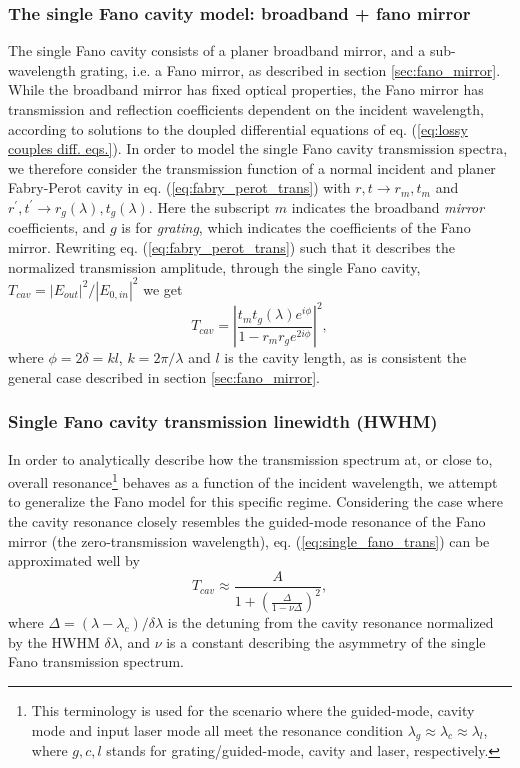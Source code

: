 \subsubsection{The single Fano cavity model: broadband + fano mirror}

The single Fano cavity consists of a planer broadband mirror, and a sub-wavelength grating, i.e. a Fano mirror, as described in section \ref{sec:fano_mirror}. While the broadband mirror has fixed optical properties, the Fano mirror has transmission and reflection coefficients dependent on the incident wavelength, according to solutions to the doupled differential equations of eq. (\ref{eq:lossy couples diff. eqs.}). In order to model the single Fano cavity transmission spectra, we therefore consider the transmission function of a normal incident and planer Fabry-Perot cavity in eq. (\ref{eq:fabry_perot_trans}) with $r,t \rightarrow r_m,t_m$ and $r^{\prime},t^{\prime} \rightarrow r_g(\lambda),t_g(\lambda)$. Here the subscript $m$ indicates the broadband \emph{mirror} coefficients, and $g$ is for \emph{grating}, which indicates the coefficients of the Fano mirror. Rewriting eq. (\ref{eq:fabry_perot_trans}) such that it describes the normalized transmission amplitude, through the single Fano cavity, $T_{cav} = |E_{out}|^2/|E_{0,in}|^2$ we get
\begin{equation}
    T_{cav} = \left|\frac{t_m t_g(\lambda) e^{i\phi}}{1 - r_m r_g e^{2i\phi}}\right|^2,
    \label{eq:single_fano_trans}
\end{equation}
where $\phi = 2\delta = kl$, $k=2 \pi / \lambda$ and $l$ is the cavity length, as is consistent the general case described in section \ref{sec:fano_mirror}.

\subsubsection{Single Fano cavity transmission linewidth (HWHM)}

In order to analytically describe how the transmission spectrum at, or close to, overall resonance\footnote{This terminology is used for the scenario where the guided-mode, cavity mode and input laser mode all meet the resonance condition $\lambda_g \approx \lambda_c \approx \lambda_l$, where $g,c,l$ stands for grating/guided-mode, cavity and laser, respectively.} behaves as a function of the incident wavelength, we attempt to generalize the Fano model for this specific regime. Considering the case where the cavity resonance closely resembles the guided-mode resonance of the Fano mirror (the zero-transmission wavelength), eq. (\ref{eq:single_fano_trans}) can be approximated well by
\begin{equation}
    T_{cav} \approx \frac{A}{1 + \left( \frac{\Delta}{1 - \nu \Delta} \right)^2},
    \label{eq:general_fano_model}
\end{equation}
where $\Delta = (\lambda - \lambda_c) / \delta \lambda$ is the detuning from the cavity resonance normalized by the HWHM $\delta \lambda$, and $\nu$ is a constant describing the asymmetry of the single Fano transmission spectrum. 

